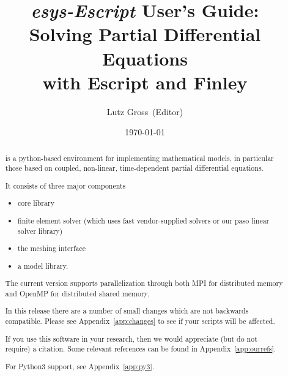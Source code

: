 \documentclass{esysdoc}
\title{\emph{esys-Escript} User's Guide:\\ Solving Partial Differential Equations\\ with Escript and Finley}
\author{Lutz Gross\etal~(Editor)}
\date{\today}
\begin{document}
\maketitle

\ifpdf
{}
\fi




\begin{abstract}%
\escript is a python-based environment for implementing mathematical models, in particular those based on coupled, non-linear, time-dependent partial differential equations.



It consists of three major components
\begin{itemize}
\item \escript core library
\item finite element solver \finley (which uses fast vendor-supplied solvers or our paso linear solver library)
\item the meshing interface \pycad
\item a model library.
\end{itemize}
The current version supports parallelization through both MPI for distributed memory and OpenMP for distributed shared memory.

In this release there are a number of small changes which are not backwards compatible.
Please see Appendix~\ref{app:changes} to see if your scripts will be affected.


If you use this software in your research, then we would appreciate (but do not require) a citation.
Some relevant references can be found in Appendix~\ref{app:ourrefs}.

For Python3 support, see Appendix~\ref{app:py3}.
\end{abstract}

\cleardoublepage{}%
\tableofcontents









\esysappendix %

%


\cleardoublepage
{}
{}
\printindex

\cleardoublepage
{}
{}


\end{document}
